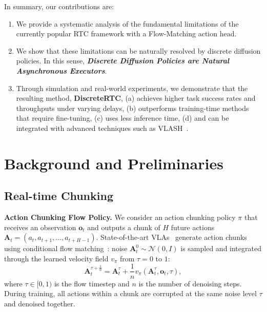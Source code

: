 \documentclass{article}
\begin{document}
In summary, our contributions are:
\begin{enumerate}
    \item We provide a systematic analysis of the fundamental limitations of the currently popular RTC framework with a Flow-Matching action head.
    \item We show that these limitations can be naturally resolved by discrete diffusion policies. In this sense, \emph{\textbf{Discrete Diffusion Policies are Natural Asynchronous Executors}}.
    \item Through simulation and real-world experiments, we demonstrate that the resulting method, \textbf{DiscreteRTC}, (a) achieves higher task success rates and throughputs under varying delays, (b) outperforms training-time methods that require fine-tuning, (c) uses less inference time, (d) and can be integrated with advanced techniques such as VLASH~\citep{tang2025vlash}.
\end{enumerate}

\newpage
\section{Background and Preliminaries}
\label{sec:background}

\subsection{Real-time Chunking}
\label{sec:bg_rtc}

\textbf{Action Chunking Flow Policy.}
We consider an action chunking policy $\pi$ that receives an observation $\mathbf{o}_t$ and outputs a chunk of $H$ future actions $\mathbf{A}_t = (a_t, a_{t+1}, \ldots, a_{t+H-1})$.
State-of-the-art VLAs~\citep{black2024pi_0, intelligence2025pi_} generate action chunks using conditional flow matching~\citep{lipman2022flow}: noise $\mathbf{A}^0_t \sim \mathcal{N}(0, I)$ is sampled and integrated through the learned velocity field $v_\pi$ from $\tau=0$ to $1$:
\begin{equation}
    \mathbf{A}_t^{\tau+\frac{1}{n}} = \mathbf{A}_t^\tau + \frac{1}{n} v_\pi( \mathbf{A}_t^\tau, \mathbf{o}_t, \tau),
    \label{eq:flow_step}
\end{equation}
where $\tau \in [0, 1)$ is the flow timestep and $n$ is the number of denoising steps.
During training, all actions within a chunk are corrupted at the same noise level $\tau$ and denoised together.
\end{document}
